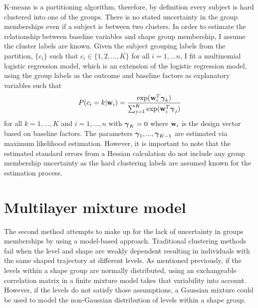 K-means is a partitioning algorithm, therefore, by definition every subject is hard clustered into one of the groups. There is no stated uncertainty in the group memberships even if a subject is between two clusters. In order to estimate the relationship between baseline variables and shape group membership, I assume the cluster labels are known. Given the subject grouping labels from the partition, $\{c_{i}\}$ such that $c_{i}\in\{1,2,...,K\}$ for all $i=1,...n$, I fit a multinomial logistic regression model, which is an extension of the logistic regression model, using the group labels as the outcome and baseline factors as explanatory variables such that
$$P(c_{i} = k|\mathbf w_{i}) = \frac{\exp(\mathbf w_{i}^{T}\boldsymbol\gamma_{k})}{\sum_{j=1}^{K}\exp(\mathbf w_{i}^{T}\boldsymbol\gamma_{j})}$$
for all $k=1,...,K$ and $i=1,...,n$ with $\boldsymbol\gamma_{K}=0$ where $\mathbf w_{i}$ is the design vector based on baseline factors. The parameters $\boldsymbol\gamma_{1},...,\boldsymbol\gamma_{K-1}$ are estimated via maximum likelihood estimation. However, it is important to note that the estimated standard errors from a Hessian calculation do not include any group membership uncertainty  as the hard clustering labels are assumed known for the estimation process.


\section{Multilayer mixture model}\label{sec:multi}
The second method attempts to make up for the lack of uncertainty in groups memberships by using a model-based approach. Traditional clustering methods fail when the level and shape are weakly dependent resulting in individuals with the same shaped trajectory at different levels. As mentioned previously, if the levels within a shape group are normally distributed, using an exchangeable correlation matrix in a finite mixture model takes that variability into account. However, if the levels do not satisfy those assumptions, a Gaussian mixture could be used to model the non-Gaussian distribution of levels within a shape group. 

